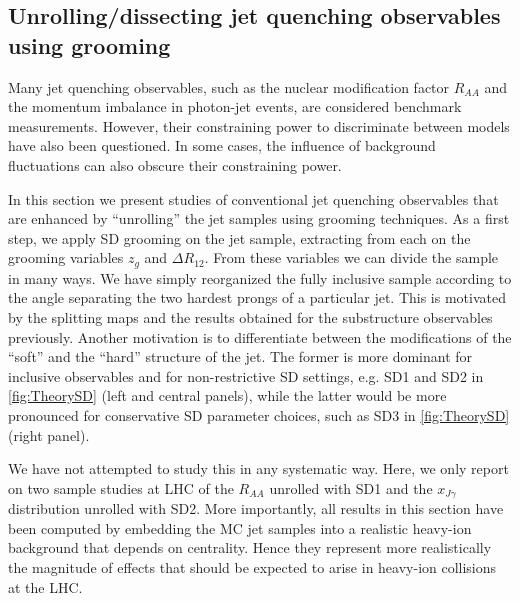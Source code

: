 

\subsection{Unrolling/dissecting jet quenching observables using grooming}
\label{sec:dissecting}

Many jet quenching observables, such as the nuclear modification factor $R_{AA}$ and the momentum imbalance in photon-jet events, are considered benchmark measurements. However, their constraining power to discriminate between models have also been questioned. In some cases, the influence of background fluctuations can also obscure their constraining power.

In this section we present studies of conventional jet quenching observables that are enhanced by ``unrolling'' the jet samples using grooming techniques. As a first step, we apply SD grooming on the jet sample, extracting from each on the grooming variables $z_g$ and $\Delta R_{12}$. From these variables we can divide the sample in many ways. We have simply reorganized the fully inclusive sample according to the angle separating the two hardest prongs of a particular jet. This is motivated by the splitting maps and the results obtained for the substructure observables previously. Another motivation is to differentiate between the modifications of the ``soft'' and the ``hard'' structure of the jet. The former is more dominant for inclusive observables and for non-restrictive SD settings, e.g. SD1 and SD2 in \autoref{fig:TheorySD} (left and central panels), while the latter would be more pronounced for conservative SD parameter choices, such as SD3 in \autoref{fig:TheorySD} (right panel).

We have not attempted to study this in any systematic way. Here, we only report on two sample studies at LHC of the $R_{AA}$ unrolled with SD1 and the $x_{J\gamma}$ distribution unrolled with SD2. More importantly, all results in this section have been computed by embedding the MC jet samples into a realistic heavy-ion background that depends on centrality. Hence they represent more realistically the magnitude of effects that should be expected to arise in heavy-ion collisions at the LHC.


